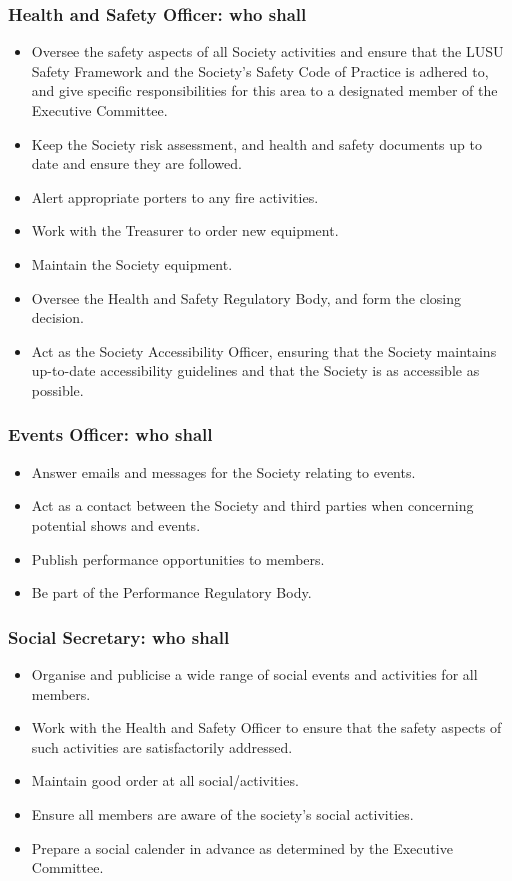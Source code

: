 \documentclass[11pt,a4paper]{article}
\begin{document}
\subsubsection{Health and Safety Officer: who shall}
\begin{itemize}
    \item Oversee the safety aspects of all Society activities and ensure that the LUSU Safety Framework and the Society's Safety Code of Practice is adhered to, and give specific responsibilities for this area to a designated member of the Executive Committee.
    \item Keep the Society risk assessment, and health and safety documents up to date and ensure they are followed.
    \item Alert appropriate porters to any fire activities.
    \item Work with the Treasurer to order new equipment.
    \item Maintain the Society equipment.
    \item Oversee the Health and Safety Regulatory Body, and form the closing decision.
    \item Act as the Society Accessibility Officer, ensuring that the Society maintains up-to-date accessibility guidelines and that the Society is as accessible as possible.
\end{itemize}

\subsubsection{Events Officer: who shall}
\begin{itemize}
    \item Answer emails and messages for the Society relating to events.
    \item Act as a contact between the Society and third parties when concerning potential shows and events.
    \item Publish performance opportunities to members.
    \item Be part of the Performance Regulatory Body.
\end{itemize}

\subsubsection{Social Secretary: who shall}
\begin{itemize}
    \item Organise and publicise a wide range of social events and activities for all members.
    \item Work with the Health and Safety Officer to ensure that the safety aspects of such activities are satisfactorily addressed.
    \item Maintain good order at all social/activities.
    \item Ensure all members are aware of the society's social activities.
    \item Prepare a social calender in advance as determined by the Executive Committee.
\end{itemize}
\end{document}
